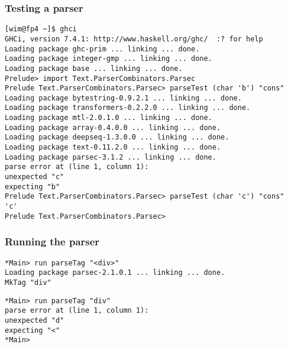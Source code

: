 \documentclass{beamer}
\begin{document}
\begin{frame}[fragile]
\frametitle{Testing a parser}

{\footnotesize
\begin{verbatim}
[wim@fp4 ~]$ ghci
GHCi, version 7.4.1: http://www.haskell.org/ghc/  :? for help
Loading package ghc-prim ... linking ... done.
Loading package integer-gmp ... linking ... done.
Loading package base ... linking ... done.
Prelude> import Text.ParserCombinators.Parsec
Prelude Text.ParserCombinators.Parsec> parseTest (char 'b') "cons"
Loading package bytestring-0.9.2.1 ... linking ... done.
Loading package transformers-0.2.2.0 ... linking ... done.
Loading package mtl-2.0.1.0 ... linking ... done.
Loading package array-0.4.0.0 ... linking ... done.
Loading package deepseq-1.3.0.0 ... linking ... done.
Loading package text-0.11.2.0 ... linking ... done.
Loading package parsec-3.1.2 ... linking ... done.
parse error at (line 1, column 1):
unexpected "c"
expecting "b"
Prelude Text.ParserCombinators.Parsec> parseTest (char 'c') "cons"
'c'
Prelude Text.ParserCombinators.Parsec> 

\end{verbatim}
}

\end{frame}
\begin{frame}[fragile]
\frametitle{Running the parser}

{\footnotesize
\begin{verbatim}
*Main> run parseTag "<div>"
Loading package parsec-2.1.0.1 ... linking ... done.
MkTag "div"
\end{verbatim}
}

{\footnotesize
\begin{verbatim}
*Main> run parseTag "div"
parse error at (line 1, column 1):
unexpected "d"
expecting "<"
*Main> 

\end{verbatim}
}

\end{frame}
\end{document}

